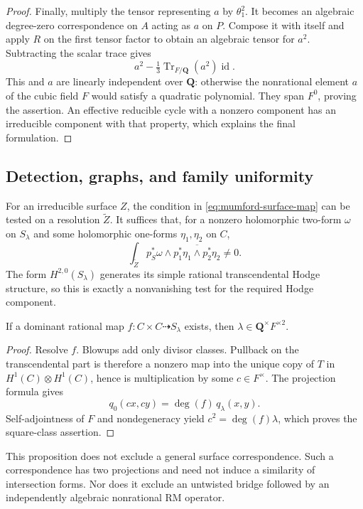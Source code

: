 \begin{proof}
Finally, multiply the tensor representing $a$ by $\theta_1^2$.
It becomes an algebraic degree-zero correspondence on $A$ acting as $a$
on $P$.  Compose it with itself and apply $R$ on the first tensor factor
to obtain an algebraic tensor for $a^2$.  Subtracting the scalar trace
gives
\[
 a^2-\tfrac13\operatorname{Tr}_{F/\mathbf Q}(a^2)\operatorname{id}.
\]
This and $a$ are linearly independent over $\mathbf Q$: otherwise the
nonrational element $a$ of the cubic field $F$ would satisfy a quadratic
polynomial.  They span $F^0$, proving the assertion.  An effective
reducible cycle with a nonzero component has an irreducible component
with that property, which explains the final formulation.
\end{proof}

\subsection{Detection, graphs, and family uniformity}

For an irreducible surface $Z$, the condition in
\eqref{eq:mumford-surface-map} can be tested on a resolution
$\widetilde Z$.  It suffices that, for a nonzero holomorphic two-form
$\omega$ on $S_\lambda$ and some holomorphic one-forms $\eta_1,\eta_2$
on $C$,
\[
 \int_{\widetilde Z}p_S^*\omega\wedge
       \overline{p_1^*\eta_1\wedge p_2^*\eta_2}\ne0.
\]
The form $H^{2,0}(S_\lambda)$ generates its simple rational
transcendental Hodge structure, so this is exactly a nonvanishing test
for the required Hodge component.

\begin{proposition}\label{prop:mumford-graph-twist}
If a dominant rational map $f:C\times C\dashrightarrow S_\lambda$
exists, then $\lambda\in\mathbf Q^\times F^{\times2}$.
\end{proposition}

\begin{proof}
Resolve $f$.  Blowups add only divisor classes.  Pullback on the
transcendental part is therefore a nonzero map into the unique copy of
$T$ in $H^1(C)\otimes H^1(C)$, hence is multiplication by some
$c\in F^\times$.  The projection formula gives
\[
 q_0(cx,cy)=\deg(f)\,q_\lambda(x,y).
\]
Self-adjointness of $F$ and nondegeneracy yield
$c^2=\deg(f)\lambda$, which proves the square-class assertion.
\end{proof}

This proposition does not exclude a general surface correspondence.
Such a correspondence has two projections and need not induce a
similarity of intersection forms.  Nor does it exclude an untwisted
bridge followed by an independently algebraic nonrational RM operator.

